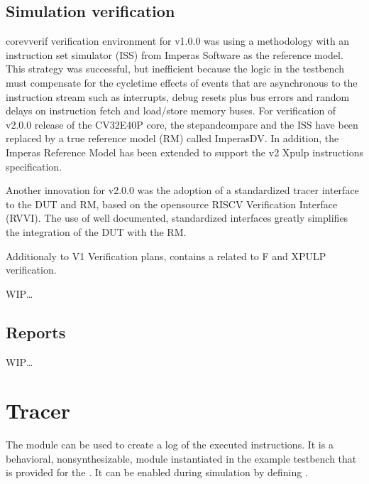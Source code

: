 \documentclass[letterpaper,10pt,english]{sphinxmanual}
\begin{document}
\subsection{Simulation verification}
\label{\detokenize{verification:simulation-verification}}
\sphinxAtStartPar
core\sphinxhyphen{}v\sphinxhyphen{}verif verification environment for v1.0.0 was using a  methodology with an instruction set simulator (ISS) from Imperas Software as the reference model.
This strategy was successful, but inefficient because the  logic in the testbench must compensate for the cycle\sphinxhyphen{}time effects of events that are asynchronous to the instruction stream such as interrupts, debug resets plus bus errors and random delays on instruction fetch and load/store memory buses.
For verification of v2.0.0 release of the CV32E40P core, the step\sphinxhyphen{}and\sphinxhyphen{}compare and the ISS have been replaced by a true reference model (RM) called ImperasDV. In addition, the Imperas Reference Model has been extended to support the v2 Xpulp instructions specification.

\sphinxAtStartPar
Another innovation for v2.0.0 was the adoption of a standardized tracer interface to the DUT and RM, based on the open\sphinxhyphen{}source RISC\sphinxhyphen{}V Verification Interface (RVVI). The use of well documented, standardized interfaces greatly simplifies the integration of the DUT with the RM.

\sphinxAtStartPar
Additionaly to V1 Verification plans,  contains a  related to F and XPULP verification.

\sphinxAtStartPar
WIP…


\subsection{Reports}
\label{\detokenize{verification:reports}}
\sphinxAtStartPar
WIP…


\section{Tracer}
\label{\detokenize{verification:tracer}}
\sphinxAtStartPar
The module  can be used to create a log of the executed instructions.
It is a behavioral, non\sphinxhyphen{}synthesizable, module instantiated in the example testbench that is provided for
the . It can be enabled during simulation by defining .
\end{document}
